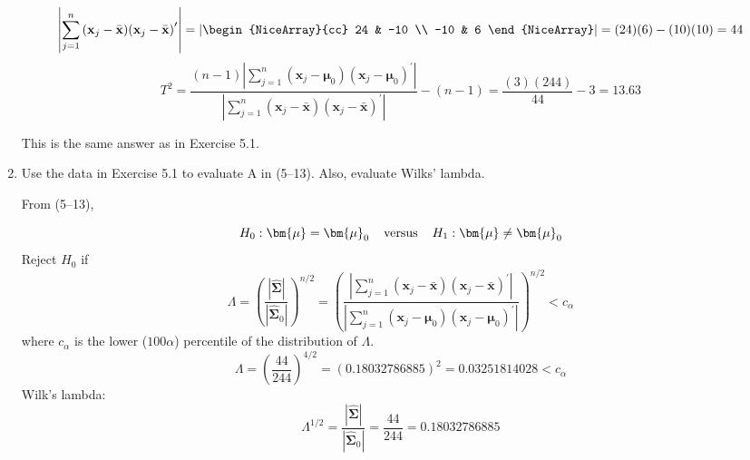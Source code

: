 \begin{enumerate}[label=(\alph*)]
    \[
        \left| \sum_{j=1}^{n}{(\textbf{x}_{j} - \bar{\textbf{x}}){(\textbf{x}_{j} - \bar{\textbf{x}})}^{\prime}} \right|
        =
        \left|
            \begin{NiceArray}{cc}
                24 & -10 \\
                -10 & 6
            \end{NiceArray}
        \right|
        =
        (24)(6) - (10)(10)
        =
        44
    \]
    \[
        T^{2}
        =
        \frac{
            (n-1)
            \left|
                \sum_{j=1}^{n}{
                    (\textbf{x}_{j} - \bm{\mu}_{0})
                    {(\textbf{x}_{j} - \bm{\mu}_{0})}^{\prime}
                }
            \right|
        }{
            \left|
                \sum_{j=1}^{n}{
                    (\textbf{x}_{j} - \bar{\textbf{x}})
                    {(\textbf{x}_{j} - \bar{\textbf{x}})}^{\prime}
                }
            \right|
        }
        -
        (n-1)
        =
        \frac{(3)(244)}{44} - 3
        =
        13.63
    \]

    This is the same answer as in Exercise 5.1.

    \item Use the data in Exercise 5.1 to evaluate A in (5--13). Also, evaluate Wilks' lambda.
    
    From (5--13),
    
    \[
        H_{0}:
        \bm{\mu}
        =
        \bm{\mu}_{0}
        \hspace{0.4cm}
        \text{versus}
        \hspace{0.4cm}
        H_{1}:
        \bm{\mu}
        \ne
        \bm{\mu}_{0}
    \]
    Reject $H_{0}$ if
    \[
        \Lambda
        =
        {\left(
            \frac{|\hat{\bm{\Sigma}}|}{|\hat{\bm{\Sigma}}_{0}|}
        \right)}^{n/2}
        =
        {\left(
            \frac{
                \left|
                    \sum_{j=1}^{n}{
                        (\textbf{x}_{j} - \bar{\textbf{x}})
                        {(\textbf{x}_{j} - \bar{\textbf{x}})}^{\prime}
                    }
                \right|
            }{
                \left|
                    \sum_{j=1}^{n}{
                        (\textbf{x}_{j} - \bm{\mu}_{0})
                        {(\textbf{x}_{j} - \bm{\mu}_{0})}^{\prime}
                    }
                \right|
            }
        \right)}^{n/2}
        < c_{\alpha}
    \]
    where $c_{\alpha}$ is the lower ($100\alpha$) percentile of the distribution of $\Lambda$.
    \[
        \Lambda
        =
        {\left(\frac{44}{244}\right)}^{4/2}
        =
        {\left(0.18032786885\right)}^{2}
        =
        0.03251814028
        <
        c_{\alpha}
    \]
    Wilk's lambda:
    \[
        \Lambda^{1/2}
        =
        \frac{|\hat{\bm{\Sigma}}|}{|\hat{\bm{\Sigma}}_{0}|}
        =
        \frac{44}{244}
        =
        0.18032786885
    \]
\end{enumerate}